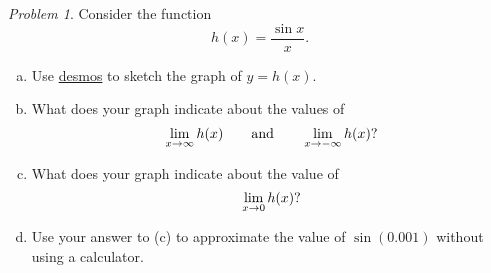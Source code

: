 \documentclass[11pt,twoside]{amsart}
\theoremstyle{plain}
\theoremstyle{remark}
\newtheorem{prob}{Problem}
\theoremstyle{definition}
\theoremstyle{definition}
\begin{document}
\begin{prob}
Consider the function
\[
  h(x) = \frac{\sin x}{x}.
\]
\begin{enumerate}[(a)]
\item Use \href{https://www.desmos.com/calculator}{desmos} to sketch the graph of $y=h(x)$.
\item What does your graph indicate about the values of
\[
  \lim_{x\to \infty}h(x)\qquad\text{and}\qquad\lim_{x\to -\infty}h(x)\text?
\]
\item What does your graph indicate about the value of
\[
  \lim_{x\to 0}h(x)\text?
\]
\item Use your answer to (c) to approximate the value of $\sin(0.001)$ without using a calculator.
\end{enumerate}
\end{prob}
\end{document}
